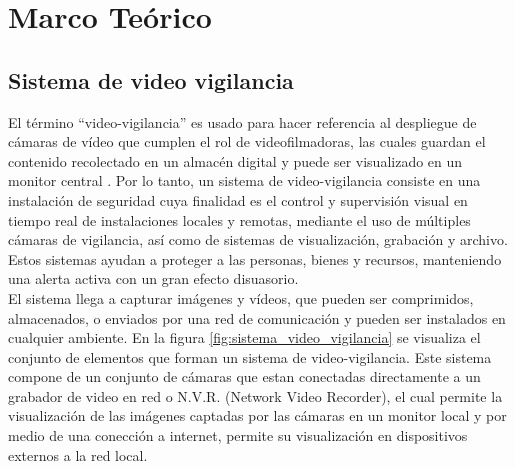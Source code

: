 
\chapter{Marco Teórico}

\section{Sistema de video vigilancia}
El término ``video-vigilancia'' es usado para hacer referencia al despliegue de cámaras de vídeo que cumplen el rol de videofilmadoras, las cuales guardan el contenido recolectado en un almacén digital y puede ser visualizado en un monitor central \cite{wikipedia:vvigilancia}. Por lo tanto, un sistema de video-vigilancia consiste en una instalación de seguridad cuya finalidad es el control y supervisión visual en tiempo real de instalaciones locales y remotas, mediante el uso de múltiples cámaras de vigilancia, así como de sistemas de visualización, grabación y archivo. Estos sistemas ayudan a proteger a las personas, bienes y recursos, manteniendo una alerta activa con un gran efecto disuasorio.\\

El sistema llega a capturar imágenes y vídeos, que pueden ser comprimidos, almacenados, o enviados por una red de comunicación y pueden ser instalados en cualquier ambiente. En la figura \ref{fig:sistema_video_vigilancia} se visualiza el conjunto de elementos que forman un sistema de video-vigilancia. Este sistema compone de un conjunto de cámaras que estan conectadas directamente a un grabador de video en red o N.V.R. (Network Video Recorder), el cual permite la visualización de las imágenes captadas por las cámaras en un monitor local y por medio de una conección a internet, permite su visualización en dispositivos externos a la red local.\\

